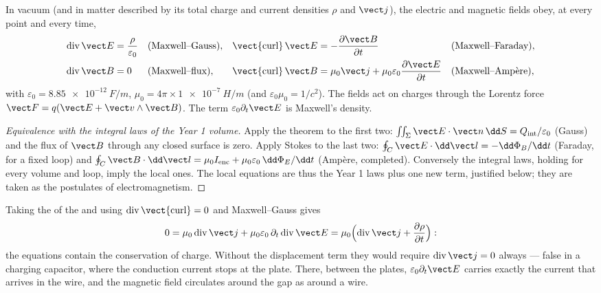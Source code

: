 \begin{theorem}\label{thm:b2:maxwell-equations:maxwell}
In vacuum (and in matter described by its total charge and current
densities $\rho$ and $\vect j$), the electric and magnetic fields obey, at
every point and every time,
\begin{align*}
\operatorname{div}\vect E &= \frac\rho{\varepsilon_0} &&\text{(Maxwell--Gauss)} , &
\operatorname{\vect{curl}}\vect E &= -\frac{\partial\vect B}{\partial t} &&\text{(Maxwell--Faraday)} ,\\
\operatorname{div}\vect B &= 0 &&\text{(Maxwell--flux)} , &
\operatorname{\vect{curl}}\vect B &= \mu_0\vect j + \mu_0\varepsilon_0\frac{\partial\vect E}{\partial t} &&\text{(Maxwell--Ampère)} ,
\end{align*}
with $\varepsilon_0 = \qty{8.85e-12}{F/m}$, $\mu_0 = 4\pi \times \qty{1e-7}{H/m}$ (and
$\varepsilon_0\mu_0 = 1/c^2$). The fields act on charges through the Lorentz
force $\vect F = q(\vect E + \vect v\wedge\vect B)$. The term $\varepsilon_0\partial_t\vect E$
is Maxwell's \emph{} density.
\end{theorem}

\begin{proof}[Equivalence with the integral laws of the Year 1 volume]
Apply the  theorem to the first two: $\iint_\Sigma\vect E\cdot
\vect n\,\dd S = Q_{\text{int}}/\varepsilon_0$ (Gauss) and the flux of $\vect B$
through any closed surface is zero. Apply Stokes to the last two:
$\oint_C\vect E\cdot\dd\vect l = -\dd\Phi_B/\dd t$ (Faraday, for a fixed loop)
and $\oint_C\vect B\cdot\dd\vect l = \mu_0I_{\text{enc}} + \mu_0\varepsilon_0\,\dd\Phi_E/\dd t$
(Ampère, completed). Conversely the integral laws, holding for every
volume and loop, imply the local ones. The local equations are thus
the Year 1 laws plus one new term, justified below; they are taken as
the postulates of electromagnetism.
\end{proof}

\begin{proposition}\label{prop:b2:maxwell-equations:displacement}
Taking the  of the  and using
$\operatorname{div}\operatorname{\vect{curl}} = 0$ and Maxwell--Gauss gives
\[
0 = \mu_0\operatorname{div}\vect j + \mu_0\varepsilon_0\,\partial_t\operatorname{div}\vect E
= \mu_0\Bigl(\operatorname{div}\vect j + \frac{\partial\rho}{\partial t}\Bigr) :
\]
the equations contain the conservation of charge. Without the
displacement term they would require $\operatorname{div}\vect j = 0$ always
--- false in a charging capacitor, where the conduction current stops
at the plate. There, between the plates, $\varepsilon_0\partial_t\vect E$ carries
exactly the current that arrives in the wire, and the magnetic field
circulates around the gap as around a wire.
\end{proposition}

